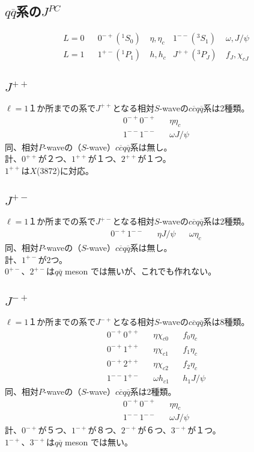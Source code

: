 \documentclass[a4j]{jarticle}
\def\Jpsi{{J\!/\!\psi}{}}
\def\cbar{\overline{{c}}}
\def\qbar{\overline{{q}}}
\begin{document}
\subsection{$q\qbar$系の$J^{PC}$}

\begin{align}
L=0&&0^{-+}(^1S_0)~ &\eta,\eta_c &1^{--}(^3S_1)~ &\omega,\Jpsi\\
L=1&&1^{+-}(^1P_1)~ &h,h_c &J^{++}(^3P_J)~ &f_J, \chi_{cJ}
\end{align}


\subsection{$J^{++}$}

$\ell=1$１か所までの系で$J^{++}$となる相対$S$-waveの$c\cbar q\qbar$系は2種類。
\begin{align}
0^{-+}0^{-+}&&\eta  \eta_c\\
1^{--}1^{--}&&\omega\Jpsi
\end{align}
同、相対$P$-waveの（$S$-wave）$c\cbar q\qbar$系は無し。\\
計、$0^{++}$が２つ、$1^{++}$が１つ、$2^{++}$が１つ。\\
$1^{++}$は$X$(3872)に対応。

\subsection{$J^{+-}$}

$\ell=1$１か所までの系で$J^{+-}$となる相対$S$-waveの$c\cbar q\qbar$系は2種類。
\begin{align}
0^{-+}1^{--}&&\eta \Jpsi && \omega \eta_c
\end{align}
同、相対$P$-waveの（$S$-wave）$c\cbar q\qbar$系は無し。\\
計、$1^{+-}$が2つ。\\
$0^{+-}$、$2^{+-}$は$q\qbar$ meson では無いが、これでも作れない。


\subsection{$J^{-+}$}
$\ell=1$１か所までの系で$J^{-+}$となる相対$S$-waveの$c\cbar q\qbar$系は8種類。
\begin{align}
0^{-+}0^{++}&&\eta\chi_{c0}&&f_0\eta_c \\
0^{-+}1^{++}&&\eta\chi_{c1}&&f_1\eta_c \\
0^{-+}2^{++}&&\eta\chi_{c2}&&f_2\eta_c \\
1^{--}1^{+-}&&\omega h_{c1} && h_1 \Jpsi
\end{align}
同、相対$P$-waveの（$S$-wave）$c\cbar q\qbar$系は2種類。
\begin{align}
0^{-+}0^{-+}&&\eta \eta_c \\
1^{--}1^{--}&&\omega \Jpsi
\end{align}
計、$0^{-+}$が５つ、$1^{-+}$が８つ、$2^{-+}$が６つ、$3^{-+}$が１つ。\\
$1^{-+}$、$3^{-+}$は$q\qbar$ meson では無い。
\end{document}
